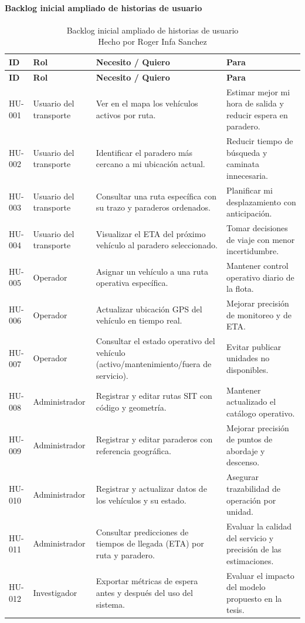 \paragraph{Backlog inicial ampliado de historias de usuario}
\begin{longtable}{|p{}|p{}|p{}|p{}|}
\caption{Backlog inicial ampliado de historias de usuario\\Hecho por Roger Infa Sanchez} \\
\hline
\textbf{ID} & \textbf{Rol} & \textbf{Necesito / Quiero} & \textbf{Para} \\
\hline
\endfirsthead
\hline
\textbf{ID} & \textbf{Rol} & \textbf{Necesito / Quiero} & \textbf{Para} \\
\hline
\endhead
HU-001 & Usuario del transporte & Ver en el mapa los vehículos activos por ruta. & Estimar mejor mi hora de salida y reducir espera en paradero. \\
\hline
HU-002 & Usuario del transporte & Identificar el paradero más cercano a mi ubicación actual. & Reducir tiempo de búsqueda y caminata innecesaria. \\
\hline
HU-003 & Usuario del transporte & Consultar una ruta específica con su trazo y paraderos ordenados. & Planificar mi desplazamiento con anticipación. \\
\hline
HU-004 & Usuario del transporte & Visualizar el ETA del próximo vehículo al paradero seleccionado. & Tomar decisiones de viaje con menor incertidumbre. \\
\hline
HU-005 & Operador & Asignar un vehículo a una ruta operativa específica. & Mantener control operativo diario de la flota. \\
\hline
HU-006 & Operador & Actualizar ubicación GPS del vehículo en tiempo real. & Mejorar precisión de monitoreo y de ETA. \\
\hline
HU-007 & Operador & Consultar el estado operativo del vehículo (activo/mantenimiento/fuera de servicio). & Evitar publicar unidades no disponibles. \\
\hline
HU-008 & Administrador & Registrar y editar rutas SIT con código y geometría. & Mantener actualizado el catálogo operativo. \\
\hline
HU-009 & Administrador & Registrar y editar paraderos con referencia geográfica. & Mejorar precisión de puntos de abordaje y descenso. \\
\hline
HU-010 & Administrador & Registrar y actualizar datos de los vehículos y su estado. & Asegurar trazabilidad de operación por unidad. \\
\hline
HU-011 & Administrador & Consultar predicciones de tiempos de llegada (ETA) por ruta y paradero. & Evaluar la calidad del servicio y precisión de las estimaciones. \\
\hline
HU-012 & Investigador & Exportar métricas de espera antes y después del uso del sistema. & Evaluar el impacto del modelo propuesto en la tesis. \\
\hline
\end{longtable}


